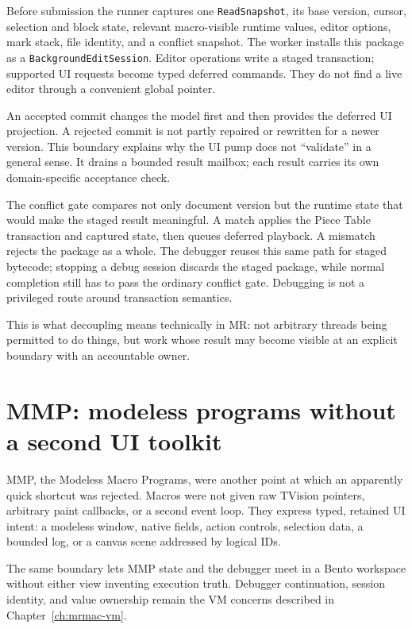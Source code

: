 \documentclass[a4paper,10pt,twoside,openany]{book}
\newcommand{\mr}{\textsc{MR}}
\begin{document}
Before submission the runner captures one \texttt{ReadSnapshot}, its base
version, cursor, selection and block state, relevant macro-visible runtime
values, editor options, mark stack, file identity, and a conflict snapshot.
The worker installs this package as a \texttt{BackgroundEditSession}. Editor
operations write a staged transaction; supported UI requests become typed
deferred commands. They do not find a live editor through a convenient global
pointer.

An accepted commit changes the model first and then provides the deferred UI
projection. A rejected commit is not partly repaired or rewritten for a newer
version. This boundary explains why the UI pump does not ``validate'' in a
general sense. It drains a bounded result mailbox; each result carries its own
domain-specific acceptance check.

The conflict gate compares not only document version but the runtime state that
would make the staged result meaningful. A match applies the Piece Table
transaction and captured state, then queues deferred playback. A mismatch
rejects the package as a whole. The debugger reuses this same path for staged
bytecode; stopping a debug session discards the staged package, while normal
completion still has to pass the ordinary conflict gate. Debugging is not a
privileged route around transaction semantics.

This is what decoupling means technically in \mr{}: not arbitrary threads
being permitted to do things, but work whose result may become visible at an
explicit boundary with an accountable owner.

\chapter{MMP: modeless programs without a second UI toolkit}
\label{ch:mmp-runtime}

MMP, the Modeless Macro Programs, were another point at which an apparently
quick shortcut was rejected. Macros were not given raw TVision pointers,
arbitrary paint callbacks, or a second event loop. They express typed,
retained UI intent: a modeless window, native fields, action controls,
selection data, a bounded log, or a canvas scene addressed by logical IDs.

The same boundary lets MMP state and the debugger meet in a Bento workspace
without either view inventing execution truth. Debugger continuation, session
identity, and value ownership remain the VM concerns described in
Chapter~\ref{ch:mrmac-vm}.
\end{document}
